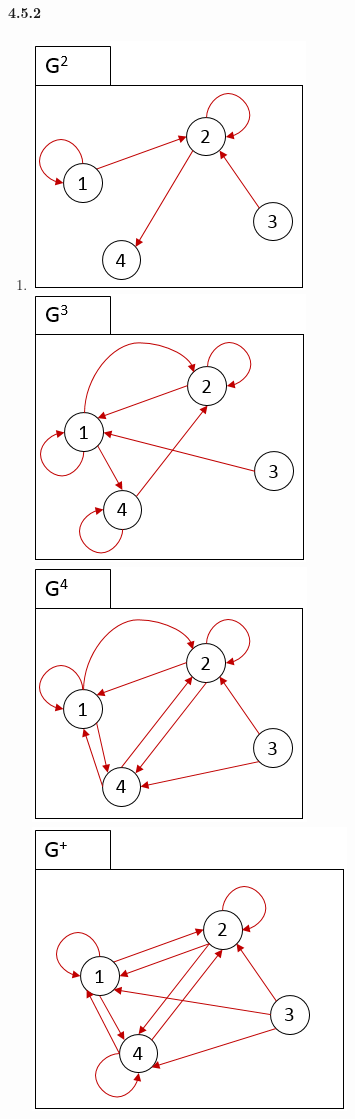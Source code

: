 \documentclass[11pt, letterpaper, twocolumn, fleqn]{article}
\begin{document}
    \paragraph{4.5.2}
        \begin{enumerate}
            \item \includegraphics[scale=.7]{452a1}
                  \includegraphics[scale=.7]{452a2}
                  \includegraphics[scale=.7]{452a3}
                  \includegraphics[scale=.7]{452a4}
        \end{enumerate}
    
\end{document}
